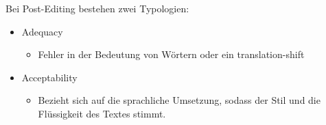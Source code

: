 \documentclass{article}
\begin{document}
	Bei Post-Editing bestehen zwei Typologien: \\
	\begin{itemize}
		\item{Adequacy}
		\begin{itemize}
			\item{Fehler in der Bedeutung von Wörtern oder ein translation-shift}
		\end{itemize}
		\item{Acceptability}
		\begin{itemize}
			\item{Bezieht sich auf die sprachliche Umsetzung, sodass der Stil und die Flüssigkeit des Textes stimmt.}
		\end{itemize}
	\end{itemize}
	


	
\end{document}
